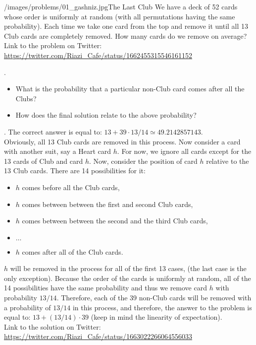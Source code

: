 \begin{problem}{/images/problems/01_gashniz.jpg}{The Last Club}
We have a deck of 52 cards whose order is uniformly at random (with all permutations having the same probability).
Each time we take one card from the top and remove it until all 13 Club cards are completely removed. How many cards do we remove on average?\\[0.2cm]

Link to the problem on Twitter:  \url{https://twitter.com/Riazi_Cafe/status/1662455315546161152}\end{problem}
\begin{hint}.
\begin{itemize}
\item What is the probability that a particular non-Club card comes after all the Clubs?
\item How does the final solution relate to the above probability?
\end{itemize}

\end{hint}
\begin{solution}.
The correct answer is equal to: $13 + 39 \cdot 13/14 \simeq 49.2142857143$.\\[0.3cm]

\noindent Obviously, all 13 Club cards are removed in this process. Now consider a card with another suit, say a Heart card $h$. For now, we ignore all cards except for the 13 cards of Club and card $h$. Now, consider the position of card $h$ relative to the 13 Club cards. There are 14 possibilities for it:

\begin{itemize}
\item $h$ comes before all the Club cards,
\item $h$ comes between  between the first and second Club cards,
\item $h$ comes between  between the second and the third Club cards,
\item $\ldots$
\item $h$ comes after all of the Club cards.
\end{itemize}

$h$ will be removed in the process for all of the first 13 cases, (the last case is the only exception). Because the order of the cards is uniformly at random, all of the 14 possibilities have the same probability and thus  we remove card $h$ with probability $13/14$. Therefore, each of the 39 non-Club cards will be removed with a probability of $13/14$ in this process, and therefore, the answer to the problem is equal to:
$13 + (13/14) \cdot 39$ (keep in mind the linearity of expectation).\\[0.2cm]

Link to the solution on Twitter:  \url{https://twitter.com/Riazi_Cafe/status/1663022266064556033}\end{solution}

